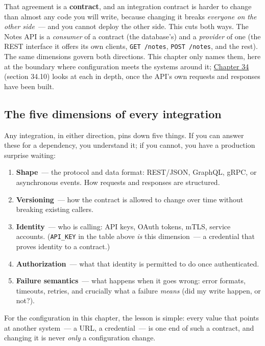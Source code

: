 That agreement is a \textbf{contract}, and an integration contract is harder to change than almost any code you will write, because changing it breaks \emph{everyone on the other side}~--- and you cannot deploy the other side. This cuts both ways. The Notes API is a \emph{consumer} of a contract (the database's) and a \emph{provider} of one (the REST interface it offers its own clients, \texttt{GET\ /notes}, \texttt{POST\ /notes}, and the rest). The same dimensions govern both directions. This chapter only names them, here at the boundary where configuration meets the systems around it; \hyperref[ch:34-response-handling]{Chapter 34} (section 34.10) looks at each in depth, once the API's own requests and responses have been built.

\subsection*{The five dimensions of every integration}\label{13-configuration-externalization:the-five-dimensions-of-every-integration}

Any integration, in either direction, pins down five things. If you can answer these for a dependency, you understand it; if you cannot, you have a production surprise waiting:

\begin{enumerate}
\def\labelenumi{\arabic{enumi}.}
\tightlist
\item
  \textbf{Shape}~--- the protocol and data format: REST/JSON, GraphQL, gRPC, or asynchronous events. How requests and responses are structured.
\item
  \textbf{Versioning}~--- how the contract is allowed to change over time without breaking existing callers.
\item
  \textbf{Identity}~--- who is calling: API keys, OAuth tokens, mTLS, service accounts. (\texttt{API\_KEY} in the table above \emph{is} this dimension~--- a credential that proves identity to a contract.)
\item
  \textbf{Authorization}~--- what that identity is permitted to do once authenticated.
\item
  \textbf{Failure semantics}~--- what happens when it goes wrong: error formats, timeouts, retries, and crucially what a failure \emph{means} (did my write happen, or not?).
\end{enumerate}

\noindent{}For the configuration in this chapter, the lesson is simple: every value that points at another system~--- a URL, a credential~--- is one end of such a contract, and changing it is never \emph{only} a configuration change.

